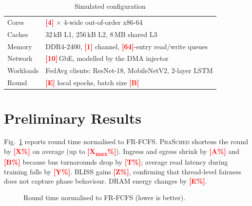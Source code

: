 \documentclass[conference]{IEEEtran}
\newcommand{\tbd}[1]{\textcolor{red}{\textbf{[#1]}}}
\newcommand{\name}{\textsc{PhaSched}}
\begin{document}
\begin{table}[t]
\centering
\caption{Simulated configuration}
\label{tab:config}
\footnotesize
\begin{tabular}{@{}ll@{}}
\toprule
Cores & \tbd{4} $\times$ 4-wide out-of-order x86-64 \\
Caches & 32\,kB L1, 256\,kB L2, 8\,MB shared L3 \\
Memory & DDR4-2400, \tbd{1} channel, \tbd{64}-entry read/write queues \\
Network & \tbd{10}\,GbE, modelled by the DMA injector \\
Workloads & FedAvg clients: ResNet-18, MobileNetV2, 2-layer LSTM \\
Round & \tbd{E} local epochs, batch size \tbd{B} \\
\bottomrule
\end{tabular}
\end{table}

\section{Preliminary Results}
Fig.~\ref{fig:results} reports round time normalised to FR-FCFS. \name{} shortens the round by \tbd{X\%} on average (up to \tbd{X\textsubscript{max}\%}). Ingress and egress shrink by \tbd{A\%} and \tbd{B\%} because bus turnarounds drop by \tbd{T\%}; average read latency during training falls by \tbd{Y\%}. BLISS gains \tbd{Z\%}, confirming that thread-level fairness does not capture phase behaviour. DRAM energy changes by \tbd{E\%}.

\begin{figure}[t]
\centering
{}
\caption{Round time normalised to FR-FCFS (lower is better).}
\label{fig:results}
\end{figure}
\end{document}
